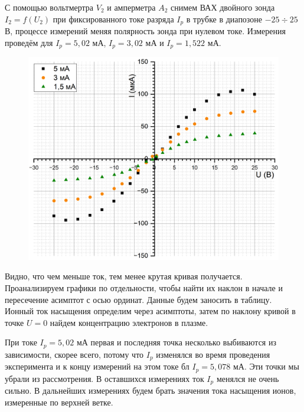 \documentclass[a4paper, 12pt]{article}
\begin{document}
	\newpage
	С помощью вольтмертра $V_2$ и амперметра $A_2$ снимем ВАХ двойного зонда $I_2 = f(U_2)$ при фиксированного токе разряда $I_p$ в трубке в диапозоне $-25 \div 25$ В, процессе измерений меняя полярность зонда при нулевом токе. Измерения проведём для $I_p = 5,02$ мА, $I_p = 3,02$ мА  и $I_p = 1,522$ мА.
	
	\begin{figure}[h!]
		\centering
		\includegraphics[width = \textwidth]{AllVAH}
	\end{figure}
	
	Видно, что чем меньше ток, тем менее крутая кривая получается. Проанализируем графики по отдельности, чтобы найти их наклон в начале и пересечение асимптот с осью ординат. Данные будем заносить в таблицу. Ионный ток насыщения определим через асимптоты, затем по наклону кривой в точке $U = 0$ найдем концентрацию электронов в плазме.
	
	При токе $I_p = 5,02$ мА первая и последняя точка несколько выбиваются из зависимости, скорее всего, потому что $I_p$ изменялся во время проведения эксперимента и к концу измерений на этом токе бл $I_p = 5,078$ мА. Эти точки мы убрали из рассмотрения. В оставшихся измерениях ток $I_p$ менялся не очень сильно. В дальнейших измерениях будем брать значения тока насыщения ионов, измеренные по верхней ветке.
	
\end{document}
